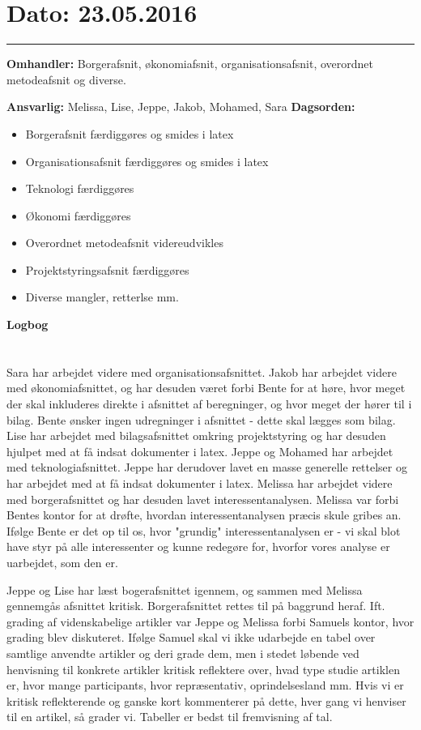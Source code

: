 \section{Dato: 23.05.2016}
\hrule

\textbf{Omhandler:} Borgerafsnit, økonomiafsnit, organisationsafsnit, overordnet metodeafsnit og diverse.

\textbf{Ansvarlig:} Melissa, Lise, Jeppe, Jakob, Mohamed, Sara
\textbf{Dagsorden:}
\begin{itemize}
	\item Borgerafsnit færdiggøres og smides i latex
	\item Organisationsafsnit færdiggøres og smides i latex
	\item Teknologi færdiggøres 
	\item Økonomi færdiggøres 
	\item Overordnet metodeafsnit videreudvikles
	\item Projektstyringsafsnit færdiggøres
	\item Diverse mangler, retterlse mm. 
\end{itemize}

\textbf{Logbog}
\\
\\ \\
Sara har arbejdet videre med organisationsafsnittet. Jakob har arbejdet videre med økonomiafsnittet, og har desuden været forbi Bente for at høre, hvor meget der skal inkluderes direkte i afsnittet af beregninger, og hvor meget der hører til i bilag. Bente ønsker ingen udregninger i afsnittet - dette skal lægges som bilag. 
Lise har arbejdet med bilagsafsnittet omkring projektstyring og har desuden hjulpet med at få indsat dokumenter i latex.
Jeppe og Mohamed har arbejdet med teknologiafsnittet. Jeppe har derudover lavet en masse generelle rettelser og har arbejdet med at få indsat dokumenter i latex.
Melissa har arbejdet videre med borgerafsnittet og har desuden lavet interessentanalysen. Melissa var forbi Bentes kontor for at drøfte, hvordan interessentanalysen præcis skule gribes an. Ifølge Bente er det op til os, hvor "grundig" interessentanalysen er - vi skal blot have styr på alle interessenter og kunne redegøre for, hvorfor vores analyse er uarbejdet, som den er. 

Jeppe og Lise har læst bogerafsnittet igennem, og sammen med Melissa gennemgås afsnittet kritisk. Borgerafsnittet rettes til på baggrund heraf. 
Ift. grading af videnskabelige artikler var Jeppe og Melissa forbi Samuels kontor, hvor grading blev diskuteret. Ifølge Samuel skal vi ikke udarbejde en tabel over samtlige anvendte artikler og deri grade dem, men i stedet løbende ved henvisning til konkrete artikler kritisk reflektere over, hvad type studie artiklen er, hvor mange participants, hvor repræsentativ, oprindelsesland mm. Hvis vi er kritisk reflekterende og ganske kort kommenterer på dette, hver gang vi henviser til en artikel, så grader vi. 
Tabeller er bedst til fremvisning af tal.
